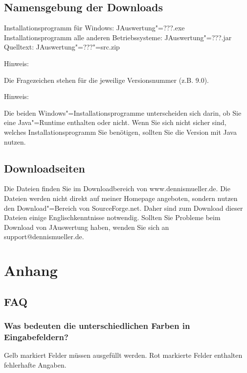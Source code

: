 \documentclass[11pt,a4paper,twoside,ngerman]{article}
\begin{document}
\subsection*{Namensgebung der Downloads}
Installationsprogramm für Windows: JAuswertung"=???.exe\\
Installationsprogramm alle anderen Betriebssysteme: JAuswertung"=???.jar\\
Quelltext: JAuswertung"=???"=src.zip

\begin{bfseries}Hinweis:\end{bfseries} Die Fragezeichen stehen für die jeweilige Versionsnummer (z.B. 9.0).

\begin{bfseries}Hinweis:\end{bfseries} Die beiden Windows"=Installationsprogramme unterscheiden sich darin, ob Sie eine Java"=Runtime enthalten oder nicht. Wenn Sie sich nicht sicher sind, welches Installationsprogramm Sie benötigen, sollten Sie die Version mit Java nutzen.


\subsection*{Downloadseiten}
Die Dateien finden Sie im Downloadbereich von www.dennismueller.de. Die Dateien werden nicht direkt auf meiner Homepage angeboten, sondern nutzen den Download"=Bereich von SourceForge.net. Daher sind zum Download dieser Dateien einige Englischkenntnisse notwendig. Sollten Sie Probleme beim Download von JAuswertung haben, wenden Sie sich an support@dennismueller.de.


\newpage

\section{Anhang}

\newpage

\subsection{FAQ}

\subsubsection*{Was bedeuten die unterschiedlichen Farben in Eingabefeldern?}
Gelb markiert Felder müssen ausgefüllt werden. Rot markierte Felder enthalten fehlerhafte Angaben.
\end{document}
